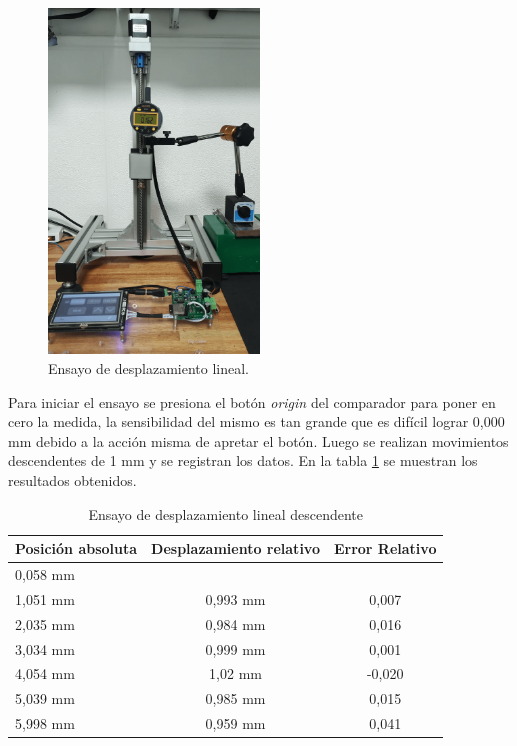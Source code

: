 \begin{figure}[h]
\centering 
\includegraphics[width=0.5\textwidth]{./Figures/desplazamiento_lineal.png}
\caption{Ensayo de desplazamiento lineal.}
\label{fig:desplazamiento_lineal}
\end{figure}


Para iniciar el ensayo se presiona el botón \textit{origin} del comparador para poner en cero la medida, la sensibilidad del mismo es tan grande que es difícil lograr 0,000 mm debido a la acción misma  de apretar el botón. Luego se realizan movimientos descendentes de 1 mm y se registran los datos.
En la tabla \ref{tab:ensayo_desplazamiento_des} se muestran los resultados obtenidos.

\begin{table}[h]
	\centering
	\caption[Ensayo de desplazamiento]{Ensayo de desplazamiento lineal descendente}
	\begin{tabular}{l c c }    
		\toprule
		\textbf{Posición absoluta}     & \textbf{Desplazamiento relativo} & \textbf{Error Relativo} \\
		\midrule
		0,058 mm	& 	        	& 	 			 	\\		
		1,051 mm    & 	0,993 mm    	& 	0,007				\\
		2,035 mm 	& 	0,984 mm	    & 	0,016 				\\
		3,034 mm	& 	0,999 mm	    & 	0,001 			\\
		4,054 mm 	& 	1,02 mm         & 	-0,020					\\
		5,039 mm 	& 	0,985 mm	    & 	0,015					\\
		5,998 mm 	& 	0,959 mm        & 	0,041 			\\
		\bottomrule
		\hline
	\end{tabular}
	\label{tab:ensayo_desplazamiento_des}
\end{table}

